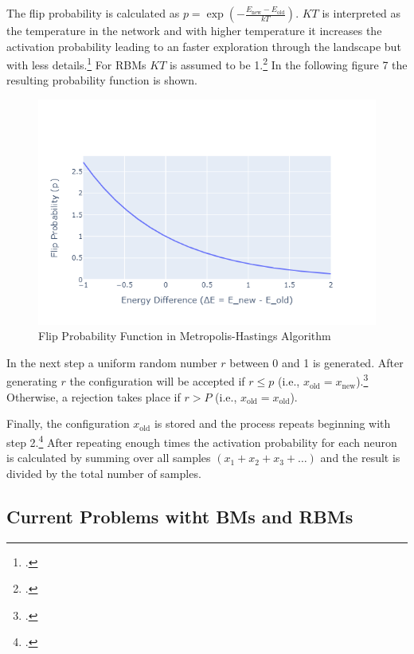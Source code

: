 The flip probability is calculated as $p=\exp\left(-\frac{E_{\text{new}}-E_{\text{old}}}{kT}\right)$.
\( KT \) is interpreted as the temperature in the network and with higher temperature it increases
the activation probability leading to an faster exploration through the landscape but with less details.\footcite[cf.][1-9]{liTemperatureBasedRestricted2016}
For \ac{RBM}s \( KT \) is assumed to be 1.\footcite[cf.][3]{hintonBoltzmannMachines2014} In the following figure 7 the resulting probability function is shown.

\begin{figure}[H]
    \centering
    \includegraphics[width=0.7\linewidth]{graphics/Flip Probability Function in Metropolis-Hastings Algorithm2.png}
    \caption{Flip Probability Function in Metropolis-Hastings Algorithm}
\end{figure}

In the next step a uniform random number $r$ between 0 and 1 is generated.
After generating $r$ the configuration will be accepted if $r \leq p$ (i.e., $x_{\text{old}}=x_{\text{new}}$).\footcite[cf.][2-3]{patronOptimalRelaxationRate2024}
Otherwise, a rejection takes place if $r > P$ (i.e., $x_{\text{old}}=x_{\text{old}}$).

Finally, the configuration $x_{\text{old}}$ is stored and the process repeats beginning with step 2.\footcite[cf.][17]{patronOptimalRelaxationRate2024}
After repeating enough times the activation probability for each neuron is calculated by summing over all samples $(x_1+x_2+x_3+\ldots)$ and the result is divided by the total number of samples.

\subsection{Current Problems witht BMs and RBMs}

